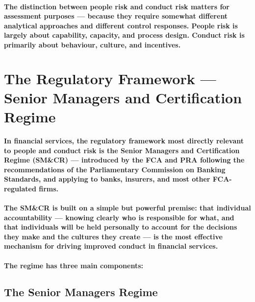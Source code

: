\paragraph{The distinction between people risk and conduct risk matters for assessment purposes — because they require somewhat different analytical approaches and different control responses. People risk is largely about capability, capacity, and process design. Conduct risk is primarily about behaviour, culture, and incentives.}

\section{The Regulatory Framework — Senior Managers and Certification Regime}
\paragraph{In financial services, the regulatory framework most directly relevant to people and conduct risk is the \textbf{Senior Managers and Certification Regime (SM\&CR)} — introduced by the FCA and PRA following the recommendations of the Parliamentary Commission on Banking Standards, and applying to banks, insurers, and most other FCA-regulated firms.}
\paragraph{The SM\&CR is built on a simple but powerful premise: that individual accountability — knowing clearly who is responsible for what, and that individuals will be held personally to account for the decisions they make and the cultures they create — is the most effective mechanism for driving improved conduct in financial services.}
\paragraph{The regime has three main components:}

\subsection{The Senior Managers Regime}

